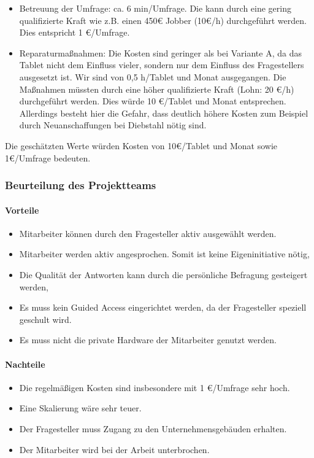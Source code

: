 \begin{itemize}
\item Betreuung der Umfrage: ca. 6 min/Umfrage. Die kann durch eine gering qualifizierte Kraft wie z.B. einen 450€ Jobber (10€/h) durchgeführt werden. Dies entspricht 1 €/Umfrage.
\item Reparaturmaßnahmen: Die Kosten sind geringer als bei Variante A, da das Tablet nicht dem Einfluss vieler, sondern nur dem Einfluss des Fragestellers ausgesetzt ist. Wir sind von 0,5 h/Tablet und Monat ausgegangen. Die Maßnahmen müssten durch eine höher qualifizierte Kraft (Lohn: 20 €/h) durchgeführt werden. Dies würde 10 €/Tablet und Monat entsprechen. Allerdings besteht hier die Gefahr, dass deutlich höhere Kosten zum Beispiel durch Neuanschaffungen bei Diebstahl nötig sind.
\end{itemize}

Die geschätzten Werte würden Kosten von 10€/Tablet und Monat sowie 1€/Umfrage bedeuten.

\subsubsection{Beurteilung des Projektteams}
\paragraph{Vorteile}

\begin{itemize}
\item Mitarbeiter können durch den Fragesteller aktiv ausgewählt werden.
\item Mitarbeiter werden aktiv angesprochen. Somit ist keine Eigeninitiative nötig,
\item Die Qualität der Antworten kann durch die persönliche Befragung gesteigert werden,
\item Es muss kein Guided Access eingerichtet werden, da der Fragesteller speziell geschult wird.
\item Es muss nicht die private Hardware der Mitarbeiter genutzt werden.
\end{itemize}

\paragraph{Nachteile}

\begin{itemize}
\item Die regelmäßigen Kosten sind insbesondere mit 1 €/Umfrage sehr hoch.
\item Eine Skalierung wäre sehr teuer.
\item Der Fragesteller muss Zugang zu den Unternehmensgebäuden erhalten.
\item Der Mitarbeiter wird bei der Arbeit unterbrochen.
\end{itemize}

